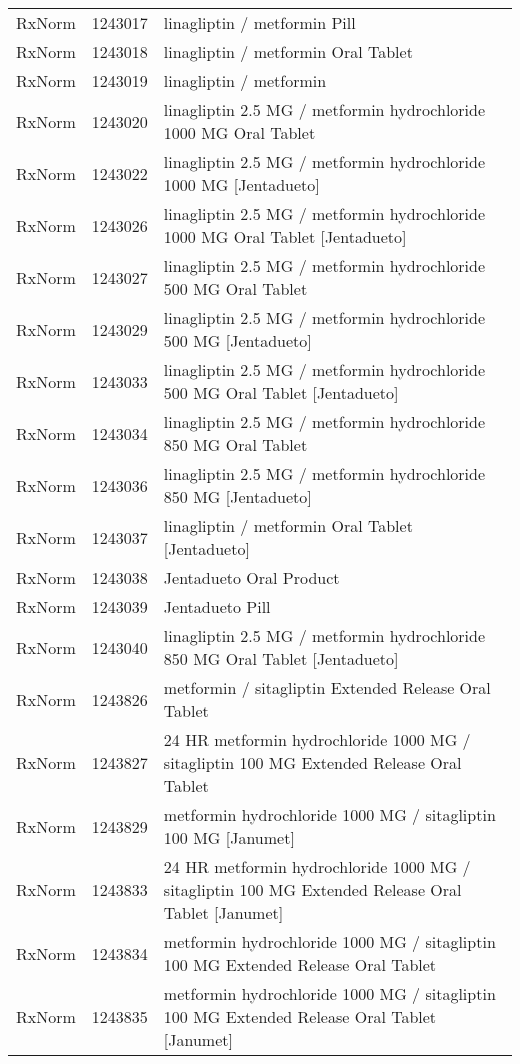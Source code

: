 \begin{longtable}{p{}p{}p{}}
  RxNorm & 1243017 & linagliptin / metformin Pill \\ 
  RxNorm & 1243018 & linagliptin / metformin Oral Tablet \\ 
  RxNorm & 1243019 & linagliptin / metformin \\ 
  RxNorm & 1243020 & linagliptin 2.5 MG / metformin hydrochloride 1000 MG Oral Tablet \\ 
  RxNorm & 1243022 & linagliptin 2.5 MG / metformin hydrochloride 1000 MG [Jentadueto] \\ 
  RxNorm & 1243026 & linagliptin 2.5 MG / metformin hydrochloride 1000 MG Oral Tablet [Jentadueto] \\ 
  RxNorm & 1243027 & linagliptin 2.5 MG / metformin hydrochloride 500 MG Oral Tablet \\ 
  RxNorm & 1243029 & linagliptin 2.5 MG / metformin hydrochloride 500 MG [Jentadueto] \\ 
  RxNorm & 1243033 & linagliptin 2.5 MG / metformin hydrochloride 500 MG Oral Tablet [Jentadueto] \\ 
  RxNorm & 1243034 & linagliptin 2.5 MG / metformin hydrochloride 850 MG Oral Tablet \\ 
  RxNorm & 1243036 & linagliptin 2.5 MG / metformin hydrochloride 850 MG [Jentadueto] \\ 
  RxNorm & 1243037 & linagliptin / metformin Oral Tablet [Jentadueto] \\ 
  RxNorm & 1243038 & Jentadueto Oral Product \\ 
  RxNorm & 1243039 & Jentadueto Pill \\ 
  RxNorm & 1243040 & linagliptin 2.5 MG / metformin hydrochloride 850 MG Oral Tablet [Jentadueto] \\ 
  RxNorm & 1243826 & metformin / sitagliptin Extended Release Oral Tablet \\ 
  RxNorm & 1243827 & 24 HR metformin hydrochloride 1000 MG / sitagliptin 100 MG Extended Release Oral Tablet \\ 
  RxNorm & 1243829 & metformin hydrochloride 1000 MG / sitagliptin 100 MG [Janumet] \\ 
  RxNorm & 1243833 & 24 HR metformin hydrochloride 1000 MG / sitagliptin 100 MG Extended Release Oral Tablet [Janumet] \\ 
  RxNorm & 1243834 & metformin hydrochloride 1000 MG / sitagliptin 100 MG Extended Release Oral Tablet \\ 
  RxNorm & 1243835 & metformin hydrochloride 1000 MG / sitagliptin 100 MG Extended Release Oral Tablet [Janumet] \\ 

\end{longtable}
